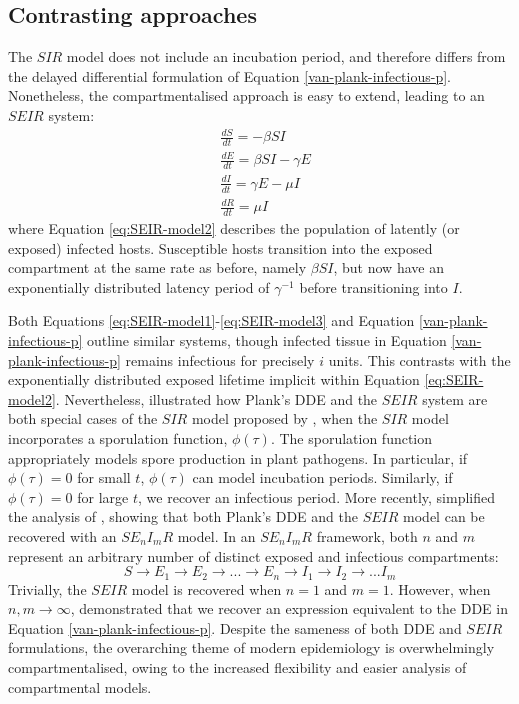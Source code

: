 \subsection{Contrasting approaches}

The $SIR$ model does not include an incubation period, and therefore differs from the delayed differential formulation 
of Equation \ref{van-plank-infectious-p}. Nonetheless, the compartmentalised approach is easy to extend, leading to an 
$SEIR$ system:
\begin{align}
\label{eq:SEIR-model1}
    &\frac{dS}{dt} = -\beta SI \\
\label{eq:SEIR-model2}
    &\frac{dE}{dt} = \beta SI - \gamma E\\
    &\frac{dI}{dt} = \gamma E - \mu I \\
    \label{eq:SEIR-model3}
    &\frac{dR}{dt} = \mu I
\end{align}
where Equation \ref{eq:SEIR-model2} describes the population of latently (or exposed) infected hosts.
Susceptible hosts transition into the exposed compartment at the same rate as before, namely $\beta SI$, but now have an
exponentially distributed latency period of $\gamma^{-1}$ before transitioning into $I$.

Both Equations \ref{eq:SEIR-model1}-\ref{eq:SEIR-model3} and Equation \ref{van-plank-infectious-p} outline similar systems,
though infected tissue in Equation \ref{van-plank-infectious-p} remains infectious for precisely $i$ units.
This contrasts with the exponentially distributed exposed lifetime implicit within Equation \ref{eq:SEIR-model2}.
Nevertheless, \cite{segarra2001epidemic} illustrated how Plank's DDE and the $SEIR$ system are both special cases of
the $SIR$ model proposed by \cite{kermack-model}, when the $SIR$ model incorporates a sporulation function, $\phi(\tau)$. 
The sporulation function appropriately models spore production in plant pathogens. 
In particular, if $\phi(\tau) = 0$ for small $t$, $\phi(\tau)$ can model incubation periods. 
Similarly, if $\phi(\tau) = 0$  for large $t$, we recover an infectious period. 
More recently, \cite{time-varying-infectivity} simplified the analysis of \cite{segarra2001epidemic}, showing that 
both Plank's DDE and the $SEIR$ model can be recovered with an $SE_nI_mR$ model.
In an $SE_nI_mR$ framework, both $n$ and $m$ represent an arbitrary number of distinct exposed and infectious compartments:
\[
    S\rightarrow E_1 \rightarrow E_2 \rightarrow ... \rightarrow E_n \rightarrow I_1 \rightarrow I_2 \rightarrow ... I_m
\]
Trivially, the $SEIR$ model is recovered when $n=1$ and $m=1$. However, when $n,m \rightarrow \infty$,
\cite{time-varying-infectivity} demonstrated that we recover an expression equivalent to the DDE in Equation \ref{van-plank-infectious-p}.
Despite the sameness of both DDE and $SEIR$ formulations, the overarching theme of modern epidemiology is overwhelmingly compartmentalised,
owing to the increased flexibility and easier analysis of compartmental models.

